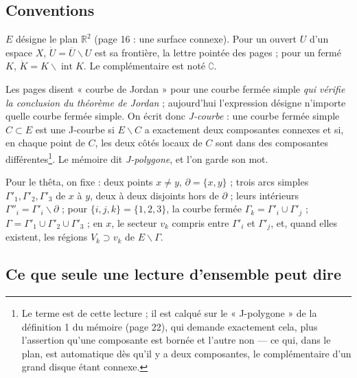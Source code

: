 \documentclass[11pt,a4paper]{article}
\begin{document}
\subsection*{Conventions}

$E$ désigne le plan $\mathbb{R}^2$ (page 16 : une surface connexe). Pour un
ouvert $U$ d'un espace $X$, $\dot{U} = \overline{U} \smallsetminus U$ est sa
frontière, la lettre pointée des pages ; pour un fermé $K$, $\dot{K} = K
\smallsetminus \operatorname{int} K$. Le complémentaire est noté
$\complement$.

Les pages disent « courbe de Jordan » pour une courbe fermée simple
\emph{qui vérifie la conclusion du théorème de Jordan} ; aujourd'hui
l'expression désigne n'importe quelle courbe fermée simple. On écrit donc
\emph{J-courbe} : une courbe fermée simple $C \subset E$ est une J-courbe si $E
\smallsetminus C$ a exactement deux composantes connexes et si, en chaque point
de $C$, les deux côtés locaux de $C$ sont dans des composantes
différentes\footnote{Le terme est de cette lecture ; il est calqué sur le
« J-polygone » de la définition 1 du mémoire (page 22), qui demande exactement
cela, plus l'assertion qu'une composante est bornée et l'autre non — ce qui,
dans le plan, est automatique dès qu'il y a deux composantes, le complémentaire
d'un grand disque étant connexe.}. Le mémoire dit \emph{J-polygone}, et l'on
garde son mot.

Pour le thêta, on fixe : deux points $x \neq y$, $\partial = \{x, y\}$ ; trois
arcs simples $\Gamma'_1, \Gamma'_2, \Gamma'_3$ de $x$ à $y$, deux à deux
disjoints hors de $\partial$ ; leurs intérieurs $\Gamma''_i = \Gamma'_i
\smallsetminus \partial$ ; pour $\{i, j, k\} = \{1, 2, 3\}$, la courbe fermée
$\Gamma_k = \Gamma'_i \cup \Gamma'_j$ ; $\Gamma = \Gamma'_1 \cup \Gamma'_2 \cup
\Gamma'_3$ ; en $x$, le secteur $v_k$ compris entre $\Gamma'_i$ et
$\Gamma'_j$, et, quand elles existent, les régions $V_k \supset v_k$ de $E
\smallsetminus \Gamma$.

\subsection*{Ce que seule une lecture d'ensemble peut dire}
\end{document}

